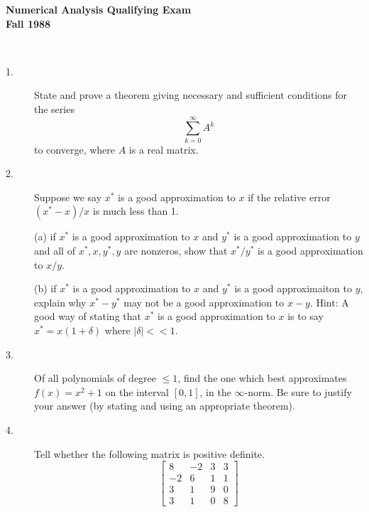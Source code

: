 \documentclass{article}
\begin{document}






\begin{center}\begin{LARGE}
{\bf Numerical Analysis Qualifying Exam}\\ 
{\bf Fall 1988}\\ \end{LARGE}
\end{center}
\vspace{0.1in}
\noindent\hrulefill\\

\begin{description}
\item[1.]
State and prove a theorem giving necessary and sufficient conditions for the
series
$$\sum^\infty_{k=0} A^k$$
to converge, where $A$ is a real matrix.

\item[2.]
Suppose we say $x^\ast$ is a good approximation to $x$ if the relative
error $(x^\ast - x)/x$ is much less than 1.

\item[\quad] (a)
if $x^\ast$ is a good approximation to $x$ and $y^\ast$ is a good approximation
to $y$ and all of $x^\ast, x, y^\ast, y$ are nonzeros, show that
$x^\ast/ y^\ast$ is a good approximation to $x/y$.

\item[\quad] (b)
if $x^\ast$ is a good approximation to $x$ and $y^\ast$ is a good
approximaiton to $y$, explain why $x^\ast - y^\ast$ may not be a good
approximation to $x-y$. Hint: A good way of stating that $x^\ast$ is a good
approximation to $x$ is to say
$x^\ast = x(1+ \delta)$ where $|\delta| << 1$.

\item[3.]
Of all polynomials of degree $\leq 1$, find the one which best approximates
$f(x) = x^2 + 1$ on the interval $[0,1]$, in the $\infty$-norm. Be sure
to justify your answer (by stating and using an appropriate theorem).

\item[4.]
Tell whether the following matrix is positive definite.
$$\left[\begin{array} {cccc}
        8&-2&3&3 \\
        -2&6&1&1 \\
        3&1&9&0 \\
        3&1&0&8
        \end{array} \right]$$


\end{description}
\end{document}
